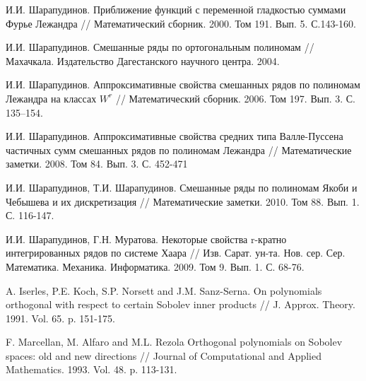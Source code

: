 \begin{thebibliography}{999}

 И.И. Шарапудинов. Приближение функций с переменной гладкостью суммами Фурье Лежандра // Математический сборник. 2000. Том 191. Вып. 5. С.143-160.




 И.И. Шарапудинов. Смешанные ряды по ортогональным полиномам // Махачкала. Издательство Дагестанского научного центра. 2004.




 И.И. Шарапудинов. Аппроксимативные свойства смешанных рядов по полиномам Лежандра на классах $W^r$ // Математический сборник. 2006. Том 197. Вып. 3. С. 135–154.




 И.И. Шарапудинов. Аппроксимативные свойства средних типа Валле-Пуссена частичных сумм смешанных рядов по полиномам Лежандра // Математические заметки. 2008. Том 84. Вып. 3. С. 452-471




 И.И. Шарапудинов, Т.И. Шарапудинов. Смешанные ряды по полиномам Якоби и Чебышева и их дискретизация // Математические заметки. 2010. Том 88. Вып. 1. С. 116-147.




 И.И. Шарапудинов,  Г.Н. Муратова. Некоторые свойства r-кратно интегрированных рядов по системе Хаара // Изв. Сарат. ун-та. Нов. сер. Сер. Математика. Механика. Информатика. 2009. Том 9. Вып. 1. С. 68-76.




 A. Iserles, P.E. Koch, S.P. Norsett and J.M. Sanz-Serna. On polynomials  orthogonal  with respect  to certain Sobolev inner products // J. Approx. Theory. 1991. Vol. 65. p. 151-175.




 F. Marcellan, M. Alfaro and M.L. Rezola Orthogonal polynomials on Sobolev spaces: old and new directions // Journal of Computational and Applied Mathematics. 1993. Vol. 48. p. 113-131.




\end{thebibliography}
